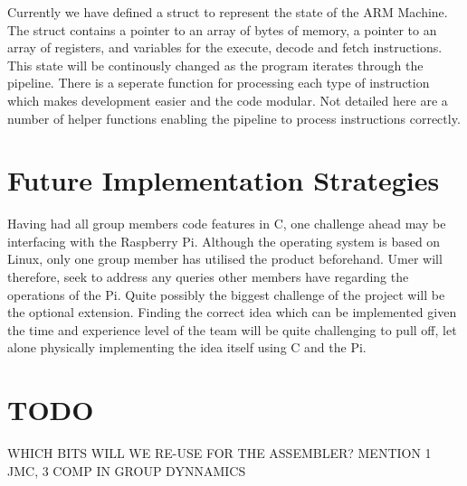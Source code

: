 \documentclass[11pt]{article}
\begin{document}
Currently we have defined a struct to represent the state of the ARM Machine. The struct contains a pointer to an array of bytes of memory, a pointer to an array of registers, and variables for the execute, decode and fetch instructions. This state will be continously changed as the program iterates through the pipeline. There is a seperate function for processing each type of instruction which makes development easier and the code modular. Not detailed here are a number of helper functions enabling the pipeline to process instructions correctly. 

\section {Future Implementation Strategies}

Having had all group members code features in C, one challenge ahead may be interfacing with the Raspberry Pi. Although the operating system is based on Linux, only one group member has utilised the product beforehand. Umer will therefore, seek to address any queries other members have regarding the operations of the Pi. Quite possibly the biggest challenge of the project will be the optional extension. Finding the correct idea which can be implemented given the time and experience level of the team will be quite challenging to pull off, let alone physically implementing the idea itself using C and the Pi. 

\section {TODO}

WHICH BITS WILL WE RE-USE FOR THE ASSEMBLER?  \newline
MENTION 1 JMC, 3 COMP IN GROUP DYNNAMICS
\end{document}
